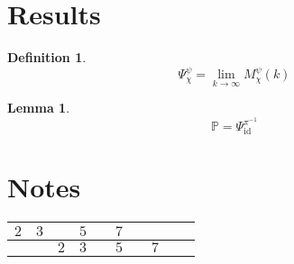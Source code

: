 \documentclass{article}
\newcommand{\inv}{^{-1}}
\DeclareMathOperator{\id}{id}
\newtheorem{definition}{Definition}
\newtheorem{lemma}{Lemma}
\begin{document}
	\section{Results}
	
	\begin{definition}
		\begin{equation}
			Ψ_χ^ψ = \lim_{k→∞} M_χ^ψ(k)
		\end{equation}
	\end{definition}
	
	\begin{lemma}
		\begin{equation}
			\mathbb{P} = Ψ_{\id}^{π\inv}
		\end{equation}
	\end{lemma}
	
	\section{Notes}
	
	\begin{tabular}{|c|c|c|c|c|c|c|c|c|c|}
		\hline
		$2$ & $3$ & & $5$ & & $7$ & & & & \\
		\hline
		& & $2$ & $3$ & & $5$ & & $7$ & &  \\
		\hline
	\end{tabular}
\end{document}
